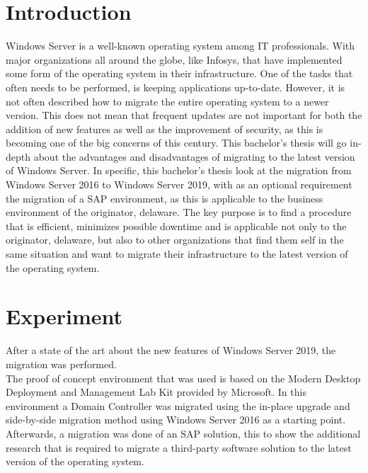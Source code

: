 \documentclass[a0,portrait]{a0poster}
\begin{document}
\begin{multicols}{2}
\section*{Introduction}
\color{black}
\color{black}
Windows Server is a well-known operating system among IT professionals. 
With major organizations all around the globe, like Infosys, that have implemented some form of the operating system in their infrastructure.
One of the tasks that often needs to be performed, is keeping applications up-to-date. 
However, it is not often described how to migrate the entire operating system to a newer version.  
This does not mean that frequent updates are not important for both the addition of new features as well as the improvement of security, as this is becoming one of the big concerns of this century. 
This bachelor's thesis will go in-depth about the advantages and disadvantages of migrating to the latest version of Windows Server.
In specific, this bachelor's thesis look at the migration from Windows Server 2016 to Windows Server 2019, with as an optional requirement the migration of a SAP environment, as this is applicable to the business environment of the originator, delaware.
The key purpose is to find a procedure that is efficient, minimizes possible downtime and is applicable not only to the originator, delaware, but also to other organizations that find them self in the same situation and want to migrate their infrastructure to the latest version of the operating system.

\color{Black} %
\color{HoGentAccent1} 
\section*{Experiment}
\color{black}
After a state of the art about the new features of Windows Server 2019, the migration was performed. \\
The proof of concept environment that was used is based on the Modern Desktop Deployment and Management Lab Kit provided by Microsoft. 
In this environment a Domain Controller was migrated using the in-place upgrade and side-by-side migration method using Windows Server 2016 as a starting point.\\
Afterwards, a migration was done of an SAP solution, this to show the additional research that is required to migrate a third-party software solution to the latest version of the operating system. 


\end{multicols}
\end{document}
